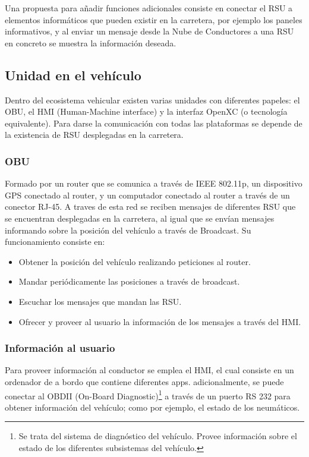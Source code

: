 Una propuesta para añadir funciones adicionales consiste en conectar el RSU a elementos informáticos que pueden existir en la carretera, por ejemplo los paneles informativos, y al enviar un mensaje desde la Nube de Conductores a una RSU en concreto se muestra la información deseada.

\subsection{Unidad en el vehículo}
Dentro del ecosistema vehicular existen varias unidades con diferentes papeles: el OBU, el HMI (Human-Machine interface) y la interfaz OpenXC (o tecnología equivalente). Para darse la comunicación con todas las plataformas se depende de la existencia de RSU desplegadas en la carretera.

\subsubsection{OBU}
Formado por un router que se comunica a través de IEEE 802.11p, un dispositivo GPS conectado al router, y un computador conectado al router a través de un conector RJ-45. A traves de esta red se reciben mensajes de diferentes RSU que se encuentran desplegadas en la carretera, al igual que se envían mensajes informando sobre la posición del vehículo a través de Broadcast. Su funcionamiento consiste en:
\begin{itemize}
	\item Obtener la posición del vehículo realizando peticiones al router.
	\item Mandar periódicamente las posiciones a través de broadcast.
	\item Escuchar los mensajes que mandan las RSU.
	\item Ofrecer y proveer al usuario la información de los mensajes a través del HMI.
\end{itemize}
	
\subsubsection{Información al usuario}
Para proveer información al conductor se emplea el HMI, el cual consiste en un ordenador de a bordo que contiene diferentes apps. adicionalmente, se puede conectar al OBDII (On-Board Diagnostic)\footnote{Se trata del sistema de diagnóstico del vehículo. Provee información sobre el estado de los diferentes subsistemas del vehículo.} a través de un puerto RS 232 para obtener información del vehículo; como por ejemplo, el estado de los neumáticos.
	
